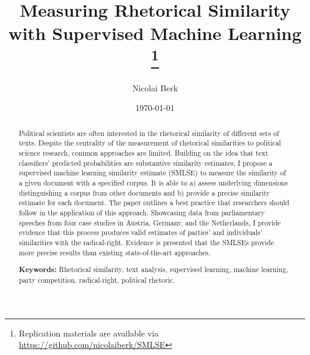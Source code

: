 \documentclass{article}
\title{Measuring Rhetorical Similarity with Supervised Machine Learning
\footnote{Replication materials are available via \href{https://github.com/nicolaiberk/SMLSE}{https://github.com/nicolaiberk/SMLSE}}
}
\author{Nicolai Berk}
\date{\today}
\begin{document}



\maketitle

\begin{abstract}
Political scientists are often interested in the rhetorical similarity of different sets of texts. Despite the centrality of the measurement of rhetorical similarities to political science research, common approaches are limited. Building on the idea that text classifiers' predicted probabilities are substantive similarity estimates, I propose a supervised machine learning similarity estimate (SMLSE) to measure the similarity of a given document with a specified corpus. It is able to a) assess underlying dimensions distinguishing a corpus from other documents and b) provide a precise similarity estimate for each document. The paper outlines a best practice that researchers should follow in the application of this approach. Showcasing data from parliamentary speeches from four case studies in Austria, Germany, and the Netherlands, I provide evidence that this process produces valid estimates of parties' and individuals' similarities with the radical-right. Evidence is presented that the SMLSEs provide more precise results than existing state-of-the-art approaches.\par \medskip

\textbf{Keywords:} Rhetorical similarity, text analysis, supervised learning, machine learning, party competition, radical-right, political rhetoric.
\end{abstract}
\end{document}
